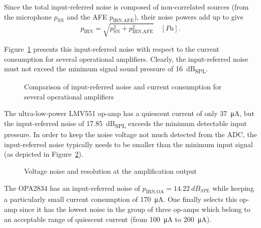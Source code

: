 \documentclass{EPL-master-thesis-covers-EN}
\newcommand{\te}[1]{\textrm{#1}}
\begin{document}
Since the total input-referred noise is composed of non-correlated sources (from the microphone $p_{\te{SN}}$ and the AFE $ p_\te{IRN,AFE}$), their noise powers add up to give
\[
 p_\te{IRN} = \sqrt{p_{\te{SN}}^2 + p_\te{IRN,AFE}^2} \quad \si{[Pa]}.
\]

Figure~\ref{fig:output_noise_op_amp} presents this input-referred noise with respect to the current consumption for several operational amplifiers. Clearly, the input-referred noise must not exceed the minimum signal sound pressure of \SI{16}{dB_{SPL}}.

\begin{figure}[H]
    \centering
    
    \caption{Comparison of input-referred noise and current consumption for several operational amplifiers}
    \label{fig:output_noise_op_amp}
\end{figure}

The ultra-low-power LMV551 op-amp has a quiescent current of only \SI{37}{\micro A}, but the input-referred noise of \SI{17.85}{dB_{SPL}} exceeds the minimum detectable input pressure.
In order to keep the noise voltage not much detected from the ADC, the input-referred noise typically needs to be smaller than the minimum input signal (as depicted in Figure~\ref{fig:ADC_res_noise}).

\begin{figure}[H]
\centering
{}
\caption{Voltage noise and resolution at the amplification output}
\label{fig:ADC_res_noise}
\end{figure}

The OPA2834 has an input-referred noise of $p_\te{IRN,OA} = \SI{14.22}{dB_{SPL}}$ while keeping a particularly small current consumption of \SI{170}{\micro A}. One finally selects this op-amp since it has the lowest noise in the group of three op-amps which belong to an acceptable range of quiescent current (from \SI{100}{\micro A} to \SI{200}{\micro A}).
\end{document}
